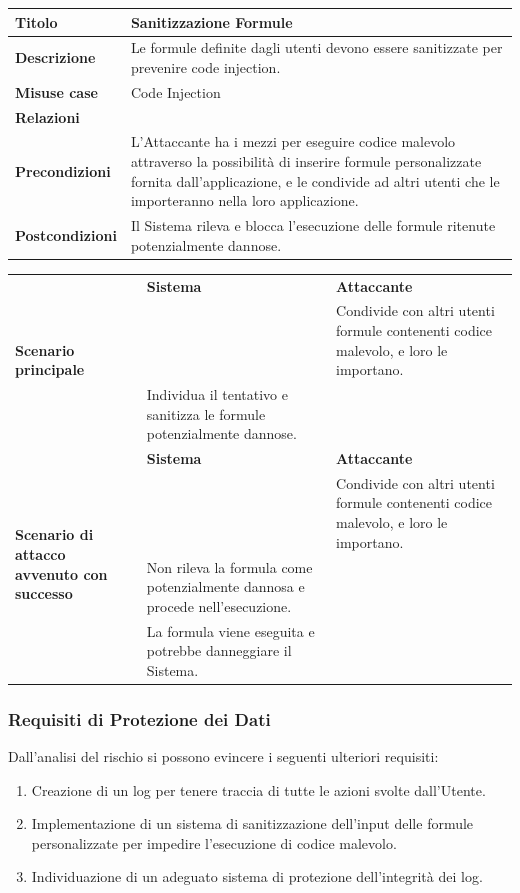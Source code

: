 \documentclass[a4paper, 11pt]{article}
\begin{document}
\clearpage
\begin{table}[h]\small
\begin{center}
\begin{tabular}{ |p{4cm}|p{11cm}|  }
\hline
\textbf{Titolo} & Sanitizzazione Formule \\
\hline
\textbf{Descrizione} & Le formule definite dagli utenti devono essere sanitizzate per prevenire code injection. \\
\hline
\textbf{Misuse case} & Code Injection \\
\hline
\textbf{Relazioni} &  \\
\hline
\textbf{Precondizioni} & L’Attaccante ha i mezzi per eseguire codice malevolo attraverso la possibilità di inserire formule personalizzate fornita dall'applicazione, e le condivide ad altri utenti che le importeranno nella loro applicazione. \\
\hline
\textbf{Postcondizioni} & Il Sistema rileva e blocca l'esecuzione delle formule ritenute potenzialmente dannose. \\
\hline
\end{tabular}
    \begin{tabular}{|p{4cm}|p{4.9cm}|p{5cm}|}
        \multirow{3}{=}{\textbf{Scenario principale}} & \textbf{Sistema} & \textbf{Attaccante}\\\cline{2-3}
        && Condivide con altri utenti formule contenenti codice malevolo, e loro le importano.\\\cline{2-3}
        & Individua il tentativo e sanitizza le formule potenzialmente dannose. & \\\cline{2-3}
         \hline
         \multirow{5}{=}{\textbf{Scenario di attacco avvenuto con successo}} & \textbf{Sistema} & \textbf{Attaccante}\\\cline{2-3}
         && Condivide con altri utenti formule contenenti codice malevolo, e loro le importano.\\\cline{2-3}
         & Non rileva la formula come potenzialmente dannosa e procede nell'esecuzione. & \\\cline{2-3}
         & La formula viene eseguita e potrebbe danneggiare il Sistema. & \\\cline{2-3}
    \hline
    \end{tabular}
\end{center}
\end{table}

\clearpage
\newpage
\subsubsection*{Requisiti di Protezione dei Dati}
Dall’analisi del rischio si possono evincere i seguenti ulteriori requisiti:
\begin{enumerate}[\indent1.]
    \item Creazione di un log per tenere traccia di tutte le azioni svolte dall’Utente.
    \item Implementazione di un sistema di sanitizzazione dell’input delle formule personalizzate per impedire l’esecuzione di codice malevolo.
    \item Individuazione di un adeguato sistema di protezione dell’integrità dei log.
\end{enumerate}
\end{document}
